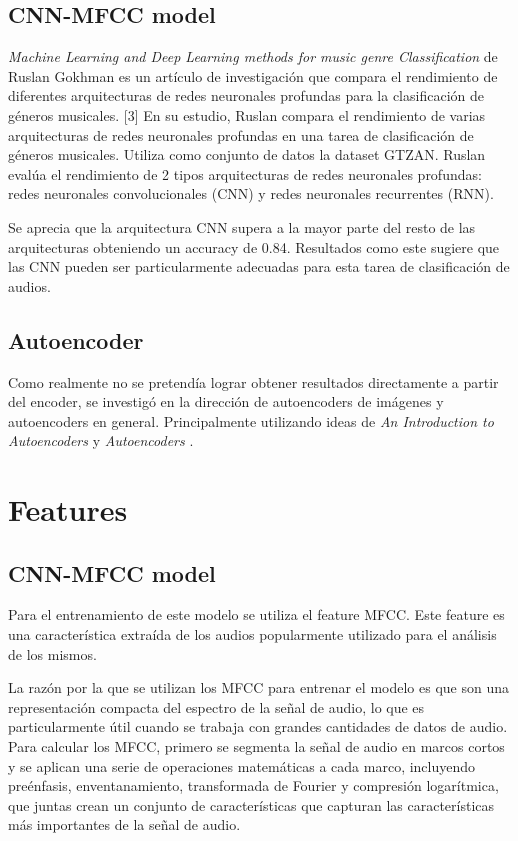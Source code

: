 \documentclass[colorinlistoftodos,twoside,twocolumn,10pt]{article} %
\begin{document}
\subsection {CNN-MFCC model}
\textit{Machine Learning and Deep Learning methods for music genre Classification} \cite{Machine Learning and Deep Learning methods for music genre Classification} de Ruslan Gokhman es un art\'iculo de investigaci\'on que compara el rendimiento de diferentes arquitecturas de redes neuronales profundas para la clasificaci\'on de g\'eneros musicales. [3]
En su estudio, Ruslan compara el rendimiento de varias arquitecturas de redes neuronales profundas en una tarea de clasificaci\'on de g\'eneros musicales. Utiliza como conjunto de datos la dataset GTZAN. Ruslan eval\'ua el rendimiento de 2 tipos arquitecturas de redes neuronales profundas: redes neuronales convolucionales (CNN) y redes neuronales recurrentes (RNN).

Se aprecia que la arquitectura CNN supera a la mayor parte del resto de las arquitecturas obteniendo un accuracy de 0.84.
Resultados como este sugiere que las CNN pueden ser particularmente adecuadas para esta tarea de clasificaci\'on de audios.

\subsection {Autoencoder}
Como realmente no se pretend\'ia lograr obtener resultados directamente a partir del encoder, se investig\'o en la direcci\'on de autoencoders de im\'agenes y autoencoders en general. Principalmente utilizando ideas de \textit{An Introduction to Autoencoders} \cite{michelucci2022introduction} y \textit{Autoencoders} \cite{bank2021autoencoders}.

\section {Features}
\subsection {CNN-MFCC model}
Para el entrenamiento de este modelo se utiliza el feature MFCC. Este feature es una caracter\'istica extra\'ida de los audios popularmente utilizado para el an\'alisis de los mismos.

La raz\'on por la que se utilizan los MFCC para entrenar el modelo es que son una representaci\'on compacta del espectro de la se\~nal de audio, lo que es particularmente \'util cuando se trabaja con grandes cantidades de datos de audio. Para calcular los MFCC, primero se segmenta la se\~nal de audio en marcos cortos y se aplican una serie de operaciones matem\'aticas a cada marco, incluyendo pre\'enfasis, enventanamiento, transformada de Fourier y compresi\'on logar\'itmica, que juntas crean un conjunto de caracter\'isticas que capturan las caracter\'isticas m\'as importantes de la se\~nal de audio.
\end{document}
